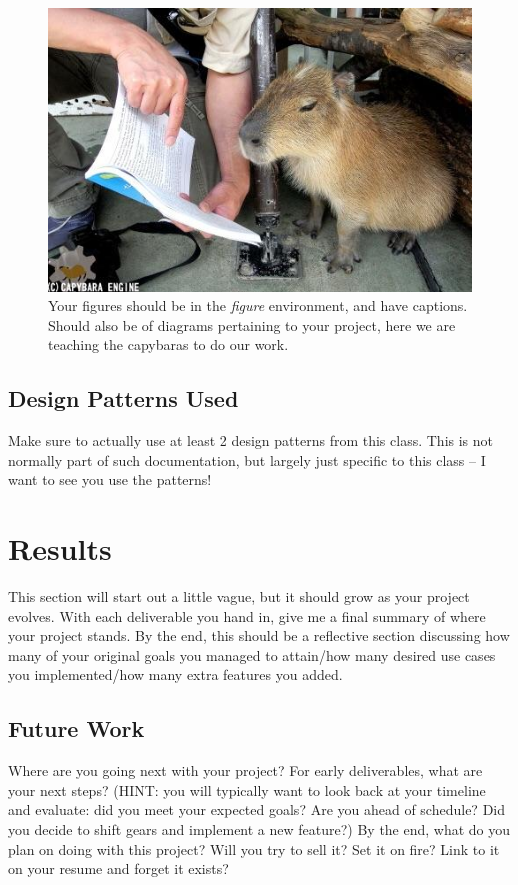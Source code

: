 \documentclass[10pt,conference,onecolumn,compsoc]{IEEEtran}
\begin{document}
\begin{figure}[ht!]
\includegraphics[scale=1]{capybara2.jpg}
\caption{Your figures should be in the \emph{figure} environment, and have captions.  Should also be of diagrams pertaining to your project, here we are teaching the capybaras to do our work.}
\label{capybara2}
\end{figure}


\subsection{Design Patterns Used}
Make sure to actually use at least 2 design patterns from this class.  This is not normally part of such documentation, but largely just specific to this class -- I want to see you use the patterns!


\section{Results}
This section will start out a little vague, but it should grow as your project evolves.  With each deliverable you hand in, give me a final summary of where your project stands.  By the end, this should be a reflective section discussing how many of your original goals you managed to attain/how many desired use cases you implemented/how many extra features you added.

\subsection{Future Work}
Where are you going next with your project?
For early deliverables, what are your next steps?  (HINT: you will typically want to look back at your timeline and evaluate: did you meet your expected goals?  Are you ahead of schedule?  Did you decide to shift gears and implement a new feature?)
By the end, what do you plan on doing with this project?  Will you try to sell it?  Set it on fire?  Link to it on your resume and forget it exists?
\end{document}
